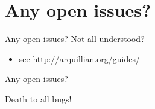\frame{\titlepage}





\section{Any open issues?}
\begin{frame}{Any open issues?}
  Not all understood? 
  \begin{itemize}

  \item see \url{http://arquillian.org/guides/}
  \end{itemize}

\vspace{2\baselineskip}
  \begin{block}{}
  \end{block}
\end{frame}

\begin{frame}{Any open issues?}
	\begin{center}
	 \Huge Death to all bugs!
	\end{center}
\end{frame}

